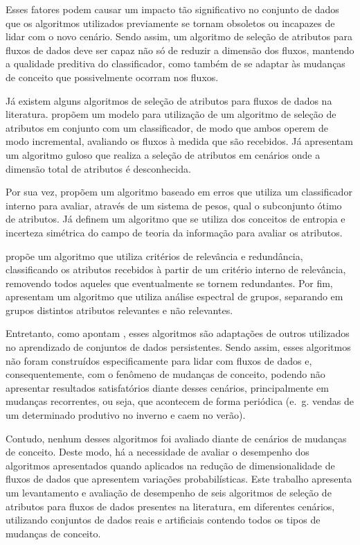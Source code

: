 Esses fatores podem causar um impacto tão significativo no conjunto de dados que os algoritmos utilizados previamente se tornam obsoletos ou incapazes de lidar com o novo cenário. Sendo assim, um algoritmo de seleção de atributos para fluxos de dados deve ser capaz não só de reduzir a dimensão dos fluxos, mantendo a qualidade preditiva do classificador, como também de se adaptar às mudanças de conceito que possivelmente ocorram nos fluxos.

Já existem alguns algoritmos de seleção de atributos para fluxos de dados na literatura. 
 propõem um modelo para utilização de um algoritmo de seleção de atributos em conjunto com um classificador, de modo que ambos operem de modo incremental, avaliando os fluxos à medida que são recebidos. Já 
 apresentam um algoritmo guloso que realiza a seleção de atributos em cenários onde a dimensão total de atributos é desconhecida.

Por sua vez,  propõem um algoritmo baseado em erros que utiliza um classificador interno para avaliar, através de um sistema de pesos, qual o subconjunto ótimo de atributos. Já  definem
um algoritmo que se utiliza dos conceitos de entropia e incerteza simétrica do campo de teoria da informação para avaliar os atributos.

 propõe um algoritmo que utiliza critérios de relevância e redundância, classificando os atributos recebidos à partir de um critério interno de relevância, removendo todos aqueles que eventualmente se tornem redundantes. Por fim,  apresentam um algoritmo que utiliza análise espectral de grupos, separando em grupos distintos atributos relevantes e não relevantes.

Entretanto, como apontam , esses algoritmos são adaptações de outros utilizados no aprendizado de conjuntos de dados persistentes. Sendo assim, esses algoritmos não foram construídos especificamente para lidar com fluxos de dados e, consequentemente, com o fenômeno de mudanças de conceito, podendo não apresentar resultados satisfatórios diante desses cenários, principalmente em mudanças recorrentes, ou seja, que acontecem de forma periódica (e.~g. vendas de um determinado produtivo no inverno e caem no verão).

Contudo, nenhum desses algoritmos foi avaliado diante de cenários de mudanças de conceito. Deste modo, há a necessidade de avaliar o desempenho dos algoritmos apresentados quando aplicados na redução de dimensionalidade de fluxos de dados que apresentem variações probabilísticas. Este trabalho apresenta um levantamento e avaliação de desempenho de seis algoritmos de seleção de atributos para fluxos de dados presentes na literatura, em diferentes cenários, utilizando conjuntos de dados reais e artificiais contendo todos os tipos de mudanças de conceito. 

